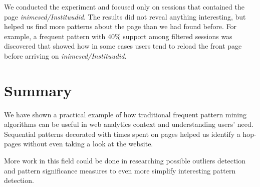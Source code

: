 \documentclass[12pt, english,a4paper]{article}
\begin{document}
We conducted the experiment and focused only on sessions that contained the page \emph{inimesed/Instituudid}. The results did not reveal anything interesting, but helped us find more patterns about the page than we had found before. For example, a frequent pattern with $40\%$ support among filtered sessions was discovered that showed how in some cases users tend to reload the front page before arriving on \emph{inimesed/Instituudid}.

\section{Summary}
We have shown a practical example of how traditional frequent pattern mining algorithms can be useful in web analytics context and understanding users' need. Sequential patterns decorated with times spent on pages helped us identify a hop-pages without even taking a look at the website.

More work in this field could be done in researching possible outliers detection and pattern significance measures to even more simplify interesting pattern detection.













\end{document}
